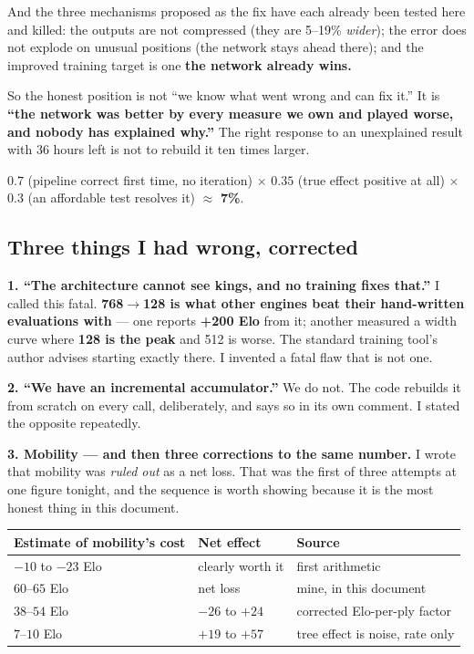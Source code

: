 \documentclass[11pt,a4paper]{article}
\newcommand{\good}[1]{\textcolor{teal!70!black}{\textbf{#1}}}
\newcommand{\bad}[1]{\textcolor{red!65!black}{\textbf{#1}}}
\begin{document}
And the three mechanisms proposed as the fix have each already been tested here and killed: the
outputs are not compressed (they are 5--19\% \emph{wider}); the error does not explode on unusual
positions (the network stays ahead there); and the improved training target is one
\textbf{the network already wins.}

\begin{keybox}
So the honest position is not ``we know what went wrong and can fix it.'' It is \textbf{``the
network was better by every measure we own and played worse, and nobody has explained why.''}
The right response to an unexplained result with 36 hours left is not to rebuild it ten times
larger.

$0.7$ (pipeline correct first time, no iteration) $\times$ $0.35$ (true effect positive at all)
$\times$ $0.3$ (an affordable test resolves it) $\approx$ \bad{7\%}.
\end{keybox}

\subsection{Three things I had wrong, corrected}

\textbf{1. ``The architecture cannot see kings, and no training fixes that.''} I called this
fatal. \textbf{768$\rightarrow$128 is what other engines beat their hand-written evaluations
with} --- one reports \good{+200 Elo} from it; another measured a width curve where \textbf{128 is
the peak} and 512 is worse. The standard training tool's author advises starting exactly there.
I invented a fatal flaw that is not one.

\textbf{2. ``We have an incremental accumulator.''} We do not. The code rebuilds it from scratch
on every call, deliberately, and says so in its own comment. I stated the opposite repeatedly.

\textbf{3. Mobility --- and then three corrections to the same number.}
I wrote that mobility was \emph{ruled out} as a net loss. That was the first of three attempts at
one figure tonight, and the sequence is worth showing because it is the most honest thing in this
document.

\begin{center}
\begin{tabular}{lll}
\toprule
Estimate of mobility's cost & Net effect & Source \\
\midrule
$-10$ to $-23$ Elo & clearly worth it & first arithmetic \\
$60$--$65$ Elo & net loss & mine, in this document \\
$38$--$54$ Elo & $-26$ to $+24$ & corrected Elo-per-ply factor \\
$7$--$10$ Elo & $+19$ to $+57$ & tree effect is noise, rate only \\
\bottomrule
\end{tabular}
\end{center}
\end{document}
